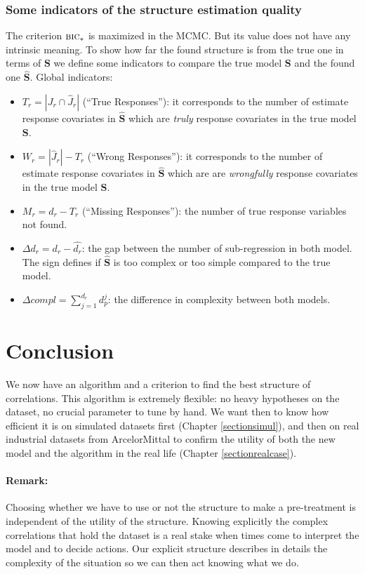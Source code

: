 \documentclass[12pt,a4paper]{report}
\begin{document}
		\subsubsection{Some indicators of the structure estimation quality} \label{sectioncompZ}
		The criterion $\mbox{{\sc bic}}_*$ is maximized in the MCMC. But its value does not have any intrinsic meaning. To show how far the found structure is from the true one in terms of $\boldsymbol{S}$ we define some indicators to compare the true model $\boldsymbol{S}$ and the found one $\hat{\boldsymbol{S}}$.
			Global indicators:
			\begin{itemize}
				\item $T_r=|J_r \cap \hat{J}_r|$ (``True Responses''): it corresponds to the number of estimate response covariates in $\hat{\boldsymbol{S}}$ which are {\it truly} response covariates in the true model $\boldsymbol{S}$.
				\item $W_r=|\hat{J}_r|-T_r$ (``Wrong Responses''): it corresponds to the number of estimate response covariates in $\hat{\boldsymbol{S}}$ which are are {\it wrongfully} response covariates in the true model $\boldsymbol{S}$.
				\item $M_r=d_r-T_r$ (``Missing Responses''): the number of true response variables not found.
				\item $\Delta d_r=d_r-\hat{d_r}$: the gap between the number of sub-regression in both model. The sign defines if $\hat{\boldsymbol{S}}$ is too complex or too simple compared to the true model.
				\item $\Delta compl=\sum_{j=1}^{d_r}d_p^j$: the difference in complexity between both models.
			\end{itemize}
			
\section{Conclusion} We now have an algorithm and a criterion to find the best structure of correlations. This algorithm is extremely flexible: no heavy hypotheses on the dataset, no crucial parameter to tune by hand. We want then to know how efficient it is on simulated datasets first (Chapter \ref{sectionsimul}), and then on real industrial datasets from ArcelorMittal to confirm the utility of both the new model and the algorithm in the real life (Chapter \ref{sectionrealcase}).	
		\paragraph{Remark:} Choosing whether we have to use or not the structure to make a pre-treatment is independent of the utility of the structure. Knowing explicitly the complex correlations that hold the dataset is a real stake when times come to interpret the model and to decide actions. Our explicit structure describes in details the complexity of the situation so we can then act knowing what we do. 		
\end{document}
